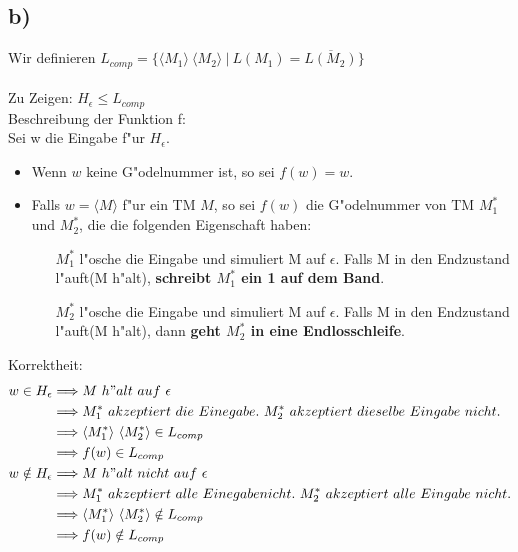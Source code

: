 \documentclass[a4paper,11pt]{scrartcl}
\begin{document}
\subsection*{b)}
	Wir definieren $L_{comp} = \{ \langle M_1 \rangle\ \langle M_2 \rangle \ |\ L(M_1) = \overline{L(M_2)}\}$
	\\ \ \\
	Zu Zeigen: $H_\epsilon \leq L_{comp}$\\
	Beschreibung der Funktion f:\\
	Sei w die Eingabe f"ur $H_\epsilon$.
	\begin{itemize}
		\item Wenn $w$ keine G"odelnummer ist, so sei $f(w) = w$.
		\item Falls $w = \langle M \rangle$ f"ur ein TM $M$, so sei $f(w)$ die G"odelnummer von TM $M^*_1$ und $M^*_2$, die die folgenden Eigenschaft haben:
		 \begin{itemize}
		 	\item[$M^*_1$] l"osche die Eingabe und simuliert M auf $\epsilon$. Falls M in den Endzustand l"auft(M h"alt), \textbf{schreibt $M^*_1$ ein 1 auf dem Band}.
		 	\item[$M^*_2$] l"osche die Eingabe und simuliert M auf $\epsilon$. Falls M in den Endzustand l"auft(M h"alt), dann \textbf{geht $M^*_2$ in eine Endlosschleife}.
		 \end{itemize}

	\end{itemize}

	Korrektheit:
	\begin{align*}
		w\in H_\epsilon &\Longrightarrow M\ h"alt\ auf\ \epsilon \\
		&\Longrightarrow M^*_1\ akzeptiert\ die\ Einegabe.\ M^*_2\ akzeptiert\ dieselbe\ Eingabe\ nicht.\\
		&\Longrightarrow \langle M^*_1 \rangle\ \langle M^*_2 \rangle \in L_{comp}\\
		&\Longrightarrow f(w) \in L_{comp}\\		
		w\notin H_\epsilon &\Longrightarrow M\ h"alt\ nicht\ auf\ \epsilon \\
		&\Longrightarrow  M^*_1\ akzeptiert\ alle\ Einegabe nicht.\ M^*_2\ akzeptiert\ alle\ Eingabe\ nicht.\\
		&\Longrightarrow \langle M^*_1 \rangle\ \langle M^*_2 \rangle \notin L_{comp}\\
		&\Longrightarrow f(w) \notin L_{comp}\\		
	\end{align*}
\end{document}
